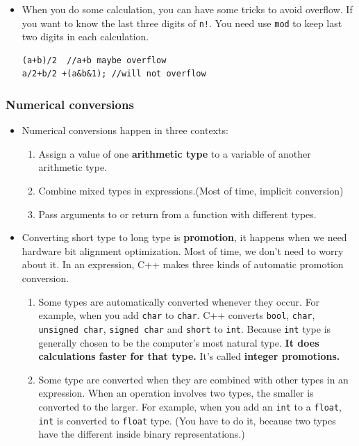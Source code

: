 \documentclass[a4paper,11pt,twoside]{book}
\begin{document}
\begin{itemize}
	\item When you do some calculation, you can have some tricks to avoid overflow. If you  want to know the last three digits of \texttt{n!}. You need use \texttt{mod} to keep last two digits in each calculation.
\begin{lstlisting}[numbers = none]
(a+b)/2  //a+b maybe overflow
a/2+b/2 +(a&b&1); //will not overflow
\end{lstlisting}
	
\end{itemize}

\subsubsection{Numerical conversions}
\begin{itemize}
	\item Numerical conversions happen in three contexts:
	\begin{enumerate}
		\item Assign a value of one \textbf{arithmetic type} to a variable of another arithmetic type.
		
		\item Combine mixed types in expressions.(Most of time, implicit conversion)
		
		\item Pass arguments to or return from a function with different types.
	\end{enumerate}
	
	\item Converting short type to long type is \textbf{promotion}, it happens when we need hardware bit alignment optimization. Most of time, we don't need to worry about it. In an expression, C++ makes three kinds of automatic promotion conversion.
	\begin{enumerate}
		\item Some types are automatically converted whenever they occur. For example, when you add \texttt{char} to \texttt{char}. C++ converts \texttt{bool}, \texttt{char}, \texttt{unsigned char}, \texttt{signed char} and \texttt{short} to \texttt{int}. Because \texttt{int} type is generally chosen to be the computer's most natural type. \textbf{It does calculations faster for that type.} It's called \textbf{integer promotions.}
		
		\item Some type are converted when they are combined with other types in an expression. When an operation involves two types, the smaller is converted to the larger. For example, when you add an \texttt{int} to a \texttt{float}, \texttt{int} is converted to \texttt{float} type. (You have to do it, because two types have the different inside binary representations.)
		

\end{enumerate}
\end{itemize}
\end{document}
